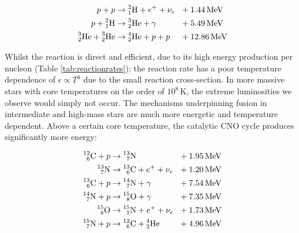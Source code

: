 \begin{equation}
  \begin{alignedat}{3}
    p + p & \rightarrow \atom{H}{2}{1} + e^+ + \nu_e && ~~ + \SI{1.44}{\mega\electronvolt} \\
    p + \atom{H}{2}{1} & \rightarrow \atom{He}{3}{2} + \gamma && ~~ + \SI{5.49}{\mega\electronvolt} \\ 
    \atom{He}{3}{2} + \atom{He}{3}{2} & \rightarrow \atom{He}{4}{2} + p + p && ~~ + \SI{12.86}{\mega\electronvolt}
  \end{alignedat}
\end{equation}

\noindent
Whilst the reaction is direct and efficient, due to its high energy production per nucleon (Table \ref{tab:reactionrates}); the reaction rate has a poor temperature dependence of $\epsilon \propto T^{4}$ due to the small reaction cross-section.
In more massive stars with core temperatures on the order of $10^8 \, \si{\kelvin}$, the extreme luminosities we observe would simply not occur.
The mechanisms underpinning fusion in intermediate and high-mass stars are much more energetic and temperature dependent.
Above a certain core temperature, the catalytic CNO cycle produces significantly more energy:

\begin{equation}
  \begin{alignedat}{3}
    \prescript{12}{6}{\text C} + p & \rightarrow \prescript{13}{7}{\text N} && ~~ + \SI{1.95}{\mega\electronvolt} \\ 
    \prescript{13}{7}{\text N} & \rightarrow \prescript{13}{6}{\text C} + e^+ + \nu_e && ~~ + \SI{1.20}{\mega\electronvolt} \\
    \prescript{13}{6}{\text C} + p & \rightarrow \prescript{14}{7}{\text N} + \gamma && ~~ + \SI{7.54}{\mega\electronvolt} \\
    \prescript{14}{7}{\text N} + p & \rightarrow \prescript{15}{8}{\text O} + \gamma && ~~ + \SI{7.35}{\mega\electronvolt} \\
    \prescript{15}{8}{\text O} & \rightarrow \prescript{15}{7}{\text N} + e^+ + \nu_e && ~~ + \SI{1.73}{\mega\electronvolt} \\
    \prescript{15}{7}{\text N} + p & \rightarrow \prescript{12}{6}{\text C} + \prescript{4}{2}{\text {He}} && ~~ + \SI{4.96}{\mega\electronvolt}
  \end{alignedat}
\end{equation}


